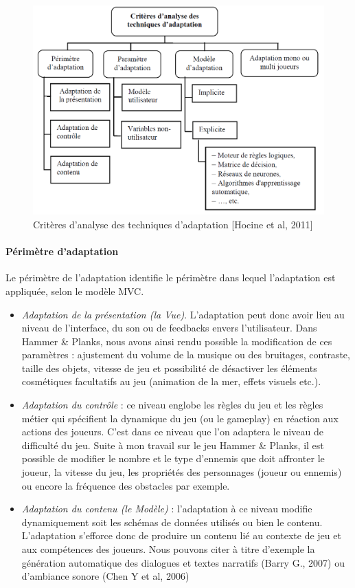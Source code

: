 \begin{figure}[!hbtp]
	\centering
	\includegraphics[width=1\linewidth]{images/criteres_adaptation.png}
	\caption{Critères d’analyse des techniques d’adaptation [Hocine et al, 2011]\cite{Hoci11}}
	\label{criteres_adaptation}
\end{figure}

	\paragraph{Périmètre d'adaptation\\}
Le périmètre de l'adaptation identifie le périmètre dans lequel l'adaptation est appliquée, selon le modèle MVC. 
\begin{itemize}
	\item \emph{Adaptation de la présentation (la Vue)}. L'adaptation peut donc avoir lieu au niveau de l'interface, du son ou de feedbacks envers l'utilisateur. Dans Hammer \& Planks, nous avons ainsi rendu possible la modification de ces paramètres : ajustement du volume de la musique ou des bruitages, contraste, taille des objets, vitesse de jeu et possibilité de désactiver les éléments cosmétiques facultatifs au jeu (animation de la mer, effets visuels etc.).
		\item  \emph{Adaptation du contrôle} : ce niveau englobe les règles du jeu et les règles métier qui spécifient la dynamique du jeu (ou le gameplay) en réaction aux actions des joueurs. C'est dans ce niveau que l'on adaptera le niveau de difficulté du jeu. Suite à mon travail sur le jeu Hammer \& Planks, il est possible de modifier le nombre et le type d'ennemis que doit affronter le joueur, la vitesse du jeu, les propriétés des personnages (joueur ou ennemis) ou encore la fréquence des obstacles par exemple.
		\item  \emph{Adaptation du contenu (le Modèle)} : l'adaptation à ce niveau modifie dynamiquement soit les schémas de données utilisés ou bien le contenu. L'adaptation s'efforce donc de produire un contenu lié au contexte de jeu et aux compétences des joueurs. Nous pouvons citer à titre d'exemple la génération automatique des dialogues et textes narratifs (Barry G., 2007) ou d'ambiance sonore (Chen Y et al, 2006)
\end{itemize} 

